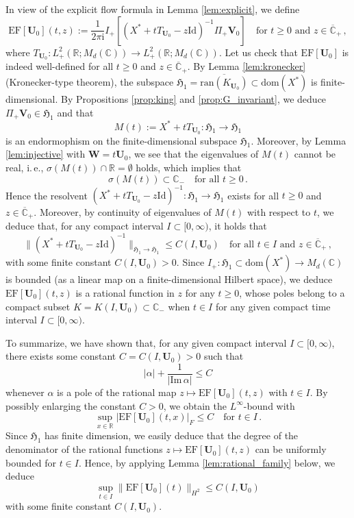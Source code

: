 \documentclass[11pt,reqno]{amsart}
\theoremstyle{definition}
\theoremstyle{remark}
\theoremstyle{remark}
\numberwithin{equation}{section}
\newcommand{\Hfr}{\mathfrak{H}}
\newcommand{\C}{\mathbb{C}}
\newcommand{\R}{\mathbb{R}}
\newcommand{\ov}{\overline}
\newcommand{\ran}{\mathrm{ran}}
\newcommand{\dom}{\mathrm{dom}}
\newcommand{\be}{\begin{equation}}
\newcommand{\ee}{\end{equation}}
\newcommand{\ii}{\mathrm{i}}
\newcommand{\Vb}{\mathbf{V}}
\newcommand{\Wb}{\mathbf{W}}
\newcommand{\Ub}{\mathbf{U}}
\newcommand{\id}{\mathrm{Id}}
\begin{document}
In view of the explicit flow formula in Lemma \ref{lem:explicit}, we define
\be \label{eq:explicit4}
\mathrm{EF}[\Ub_0](t,z) := \frac{1}{2 \pi \ii} I_+ \left [( X^*+ t T_{\Ub_0} -z \id)^{-1} \Pi_+ \Vb_0 \right ] \quad \mbox{for $t \geq 0$ and $z \in \ov{\C}_+$} \, ,
\ee
where $T_{\Ub_0} : L^2_+(\R; M_d(\C)) \to L^2_+(\R; M_d(\C))$. Let us check that $\mathrm{EF}[\Ub_0]$ is indeed well-defined for all $t \geq 0$ and $z \in \ov{\C}_+$. By Lemma \ref{lem:kronecker} (Kronecker-type theorem), the subspace $\Hfr_1 = \ov{\ran(K_{\Ub_0})} \subset \dom(X^*)$ is finite-dimensional. By Propositions \ref{prop:king} and \ref{prop:G_invariant}, we deduce $
\Pi_+ \Vb_0 \in \Hfr_1$ and that
$$
M(t) := X^* + t T_{\Ub_0} : \Hfr_1 \to \Hfr_1
$$ 
is an endormophism on the finite-dimensional subspace $\Hfr_1$. Moreover, by Lemma \ref{lem:injective} with $\Wb = t \Ub_0$, we see that the eigenvalues of $M(t)$ cannot be real, i.\,e., 
$\sigma(M(t)) \cap \R = \emptyset$ holds, which implies that 
$$
\sigma(M(t)) \subset \C_- \quad \mbox{for all $t \geq 0$} \, .
$$ 
Hence the resolvent $(X^* + t T_{\Ub_0}- z \id)^{-1} : \Hfr_1 \to \Hfr_1$ exists for all $t \geq 0$ and $z \in \ov{\C}_+$. Moreover, by continuity of eigenvalues of $M(t)$ with respect to $t$, we deduce that, for any compact interval $I \subset [0,\infty)$, it holds that
$$
\| (X^* + t T_{\Ub_0}-z\id)^{-1} \|_{\Hfr_1 \to \Hfr_1} \leq C(I, \Ub_0) \quad \mbox{for all $t \in I$ and $z \in \ov{\C}_+$} \, ,
$$
with some finite constant $C(I, \Ub_0) >0$. Since $I_+ : \Hfr_1 \subset \dom(X^*) \to M_d(\C)$ is bounded (as a linear map on a finite-dimensional Hilbert space), we deduce $\mathrm{EF}[\Ub_0](t,z)$ is a rational function in $z$ for any $t \geq 0$, whose poles belong to a compact subset $K =K(I, \Ub_0) \subset \C_-$ when $t \in I$ for any given compact time interval $I \subset [0,\infty)$. 

To summarize, we have shown that, for any given compact interval $I \subset [0,\infty)$, there exists some constant $C = C(I, \Ub_0)> 0$ such that
$$
|\alpha | + \frac{1}{|\mathrm{Im} \, \alpha|} \leq C
$$ 
whenever $\alpha$ is a pole of the rational map $z \mapsto \mathrm{EF}[\Ub_0](t,z)$ with $t \in  I$. By possibly enlarging the constant $C>0$, we obtain the $L^\infty$-bound with
$$
\sup_{x \in \R} | \mathrm{EF}[\Ub_0](t,x) |_F \leq C \quad \mbox{for $t \in I$} \, .
$$
Since $\Hfr_1$ has finite dimension, we easily deduce that the degree of the denominator of the rational functions $z \mapsto \mathrm{EF}[\Ub_0](t,z)$ can be uniformly bounded for $t \in I$. Hence, by applying Lemma \ref{lem:rational_family} below, we deduce
$$
\sup_{t \in I} \| \mathrm{EF}[\Ub_0](t) \|_{H^2} \leq C(I, \Ub_0)
$$
with some finite constant $C(I, \Ub_0)$. 
\end{document}
